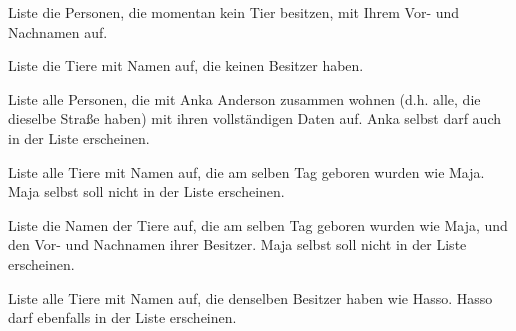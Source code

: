 \begin{compactenum}[a)]
\item Liste die Personen, die momentan kein Tier besitzen, mit Ihrem Vor- und
 Nachnamen auf.
\item Liste die Tiere mit Namen auf, die keinen Besitzer haben.
\item Liste alle Personen, die mit Anka Anderson zusammen wohnen (d.h. alle, die
 dieselbe Straße haben) mit ihren vollständigen Daten auf. Anka selbst darf
 auch in der Liste erscheinen.
\item Liste alle Tiere mit Namen auf, die am selben Tag geboren wurden wie Maja.
 Maja selbst soll nicht in der Liste erscheinen.
\item Liste die Namen der Tiere auf, die am selben Tag geboren wurden wie Maja,
und den Vor- und Nachnamen ihrer Besitzer. Maja selbst soll nicht in der Liste
erscheinen.
\item Liste alle Tiere mit Namen auf, die denselben Besitzer haben wie Hasso.
Hasso darf ebenfalls in der Liste erscheinen.
\end{compactenum}